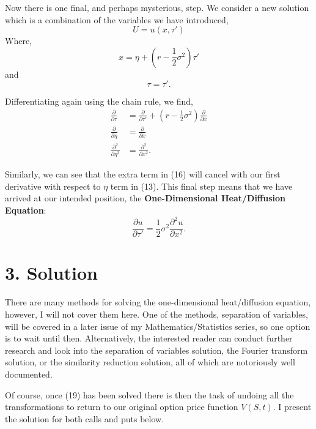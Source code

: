\documentclass[11pt]{article}
\begin{document}
Now there is one final, and perhaps mysterious, step. We consider a new solution which is a combination of the variables we have introduced,
\begin{equation}
    U = u(x,\tau') 
\end{equation}
Where,
\begin{equation}
    x = \eta + \left( r - \frac{1}{2} \sigma^2 \right) \tau'
\end{equation}
and
\begin{equation}
    \tau = \tau'.
\end{equation}

Differentiating again using the chain rule, we find,
\begin{align}
    \frac{\partial}{\partial \tau} &= \frac{\partial}{\partial \tau'} + \left( r - \frac{1}{2} \sigma^2 \right) \frac{\partial}{\partial x} \\
    \frac{\partial}{\partial \eta} &= \frac{\partial}{\partial x} \\
    \frac{\partial^2}{\partial \eta^2} &= \frac{\partial^2}{\partial x^2}.
\end{align}

Similarly, we can see that the extra term in (16) will cancel with our first derivative with respect to $\eta$ term in (13). This final step means that we have arrived at our intended position, the \textbf{One-Dimensional Heat/Diffusion Equation}:
\begin{equation}
    \frac{\partial u}{\partial \tau'} = \frac{1}{2} \sigma^2 \frac{\partial^2 u}{\partial x^2}.     
\end{equation}

\section*{3. Solution}
There are many methods for solving the one-dimensional heat/diffusion equation, however, I will not cover them here. One of the methods, separation of variables, will be covered in a later issue of my Mathematics/Statistics series, so one option is to wait until then. Alternatively, the interested reader can conduct further research and look into the separation of variables solution, the Fourier transform solution, or the similarity reduction solution, all of which are notoriously well documented.

Of course, once (19) has been solved there is then the task of undoing all the transformations to return to our original option price function $V(S,t)$. I present the solution for both calls and puts below.
\end{document}
